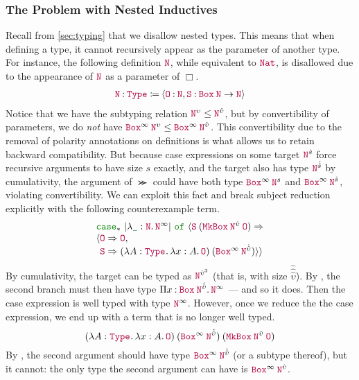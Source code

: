 \subsubsection{The Problem with Nested Inductives}

\newcommand{\nat}{\const{N}}

Recall from \autoref{sec:typing} that we disallow nested \coinductive types.
This means that when defining a \coinductive type, it cannot recursively appear as the parameter of another type.
For instance, the following definition $\nat$, while equivalent to $\Nat$,
is disallowed due to the appearance of $\nat$ as a parameter of $\Box$.
\begin{align*}
  \defn{\nat}{\Type{}}{\seq{\assm{\Zero}{\nat}, \assm{\Succ}{\app{\Box}{\nat} \to \nat}}}
\end{align*}
Notice that we have the subtyping relation $\nat^\upsilon \leq \nat^{\hat{\upsilon}}$,
but by convertibility of parameters,
we do \emph{not} have $\app{\Box^\infty}{\nat^\upsilon} \leq \app{\Box^\infty}{\nat^{\hat{\upsilon}}}$.
This convertibility due to the removal of polarity annotations on \coinductive definitions is what allows us to retain backward compatibility.
But because case expressions on some target $\nat^{\hat{s}}$ force recursive arguments to have size $s$ exactly,
and the target also has type $\nat^{\hat{\hat{s}}}$ by cumulativity,
the argument of $\Succ$ could have both type $\app{\Box^\infty}{\nat^s}$ and $\app{\Box^\infty}{\nat^{\hat{s}}}$, violating convertibility.
We can exploit this fact and break subject reduction explicitly with the following counterexample term.
\begin{displaymath}
\begin{array}{l}
  \caseof*{\erase{\abs{\any}{\nat}{\nat^\infty}}}{\app{\Succ}{(\app{\MkBox}{\nat^{\hat{\upsilon}}}{\Zero})}}{\\
  \seq{\Zero \Rightarrow \Zero,\\
  \phantom{\langle} \Succ \Rightarrow \app{(\abs{A}{\Type{}}{\abs{x}{A}{\Zero}})}{(\app{\Box^\infty}{\nat^{\hat{\hat{\upsilon}}}})}}}
\end{array}
\end{displaymath}
By cumulativity, the target can be typed as $\nat^{\hat{\upsilon}^{3}}$ (that is, with size $\hat{\hat{\hat{\upsilon}}}$).
By , the second branch must then have type $\prod{x}{\app{\Box}{\nat^{\hat{\hat{\upsilon}}}}}{\nat^\infty}$ --- and so it does.
Then the case expression is well typed with type $\nat^\infty$.
However, once we reduce the the case expression, we end up with a term that is no longer well typed.
\begin{displaymath}
  \app{(\abs{A}{\Type{}}{\abs{x}{A}{\Zero}})}
    {(\app{\Box^\infty}{\nat^{\hat{\hat{\upsilon}}}})}
    {(\app{\MkBox}{\nat^{\hat{\upsilon}}}{\Zero})}
\end{displaymath}
By , the second argument should have type $\app{\Box^\infty}{\nat^{\hat{\hat{\upsilon}}}}$ (or a subtype thereof), but it cannot:
the only type the second argument can have is $\app{\Box^\infty}{\nat^{\hat{\upsilon}}}$.

